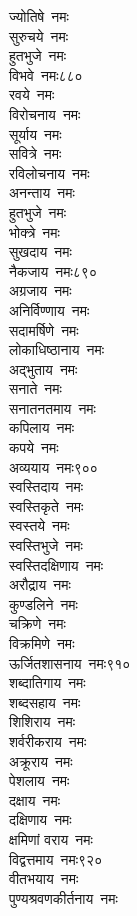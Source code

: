 \begin{multicols}{2}
\begin{flushleft}
ज्योतिषे~नमः\\
सुरुचये~नमः\\
हुतभुजे~नमः\\
विभवे~नमः\hfill ८८०\\
रवये~नमः\\
विरोचनाय~नमः\\
सूर्याय~नमः\\
सवित्रे~नमः\\
रविलोचनाय~नमः\\
अनन्ताय~नमः\\
हुतभुजे~नमः\\
भोक्त्रे~नमः\\
सुखदाय~नमः\\
नैकजाय~नमः\hfill ८९०\\
अग्रजाय~नमः\\
अनिर्विण्णाय~नमः\\
सदामर्षिणे~नमः\\
लोकाधिष्ठानाय~नमः\\
अद्भुताय~नमः\\
सनाते~नमः\\
सनातनतमाय~नमः\\
कपिलाय~नमः\\
कपये~नमः\\
अव्ययाय~नमः\hfill ९००\\
स्वस्तिदाय~नमः\\
स्वस्तिकृते~नमः\\
स्वस्तये~नमः\\
स्वस्तिभुजे~नमः\\
स्वस्तिदक्षिणाय~नमः\\
अरौद्राय~नमः\\
कुण्डलिने~नमः\\
चक्रिणे~नमः\\
विक्रमिणे~नमः\\
ऊर्जितशासनाय~नमः\hfill ९१०\\
शब्दातिगाय~नमः\\
शब्दसहाय~नमः\\
शिशिराय~नमः\\
शर्वरीकराय~नमः\\
अक्रूराय~नमः\\
पेशलाय~नमः\\
दक्षाय~नमः\\
दक्षिणाय~नमः\\
क्षमिणां वराय~नमः\\
विद्वत्तमाय~नमः\hfill ९२०\\
वीतभयाय~नमः\\
पुण्यश्रवणकीर्तनाय~नमः\\

\end{flushleft}
\end{multicols}
